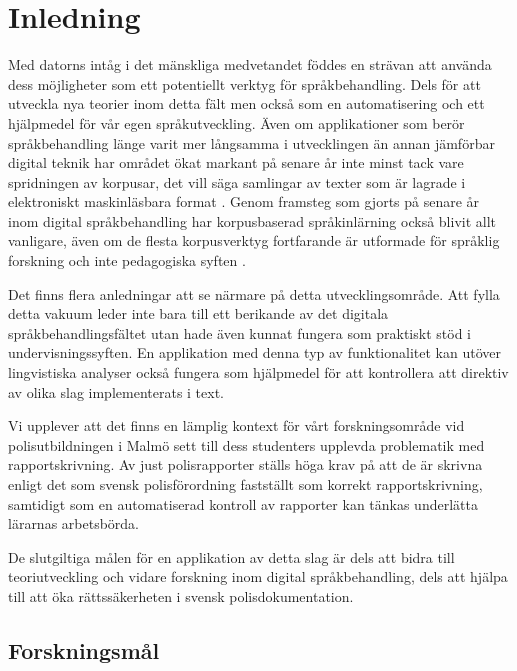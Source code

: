 \documentclass[swedish]{maucsthesis}
\begin{document}
\ifodd\value{page}\else\mbox{}\newpage\fi
\tableofcontents
\newpage
\startpagecount

\section{Inledning}
Med datorns intåg i det mänskliga medvetandet föddes en strävan att använda
dess möjligheter som ett potentiellt verktyg för språkbehandling. Dels för
att utveckla nya teorier inom detta fält men också som en automatisering och ett
hjälpmedel för vår egen språkutveckling. Även om applikationer som berör
språkbehandling länge varit mer långsamma i utvecklingen än annan jämförbar
digital teknik har området ökat markant på senare år inte minst tack vare
spridningen av korpusar, det vill säga samlingar av texter som är lagrade i elektroniskt
maskinläsbara format \cite{nugues:2014}. Genom framsteg som gjorts på senare år inom digital språkbehandling har korpusbaserad språkinlärning också blivit allt
vanligare, även om de flesta korpusverktyg fortfarande är utformade för språklig
forskning och inte pedagogiska syften \cite{zhu:2015}.

Det finns flera anledningar att se närmare på detta utvecklingsområde. Att fylla detta vakuum leder inte bara till ett berikande av det digitala språkbehandlingsfältet utan hade även kunnat fungera som praktiskt stöd i undervisningssyften.
En applikation med denna typ av funktionalitet kan utöver lingvistiska analyser
också fungera som hjälpmedel för att kontrollera att direktiv av olika slag
implementerats i text.

Vi upplever att det finns en lämplig kontext för vårt forskningsområde vid polisutbildningen i Malmö sett till dess studenters upplevda problematik med rapportskrivning. Av just polisrapporter
ställs höga krav på att de är skrivna enligt det som svensk polisförordning fastställt som korrekt rapportskrivning, samtidigt som en automatiserad kontroll av rapporter kan tänkas underlätta lärarnas arbetsbörda.

De slutgiltiga målen för en applikation av detta slag är dels att bidra till
teoriutveckling och vidare forskning inom digital språkbehandling, dels att hjälpa till att
öka rättssäkerheten i svensk polisdokumentation.

\subsection{Forskningsmål}
\end{document}
